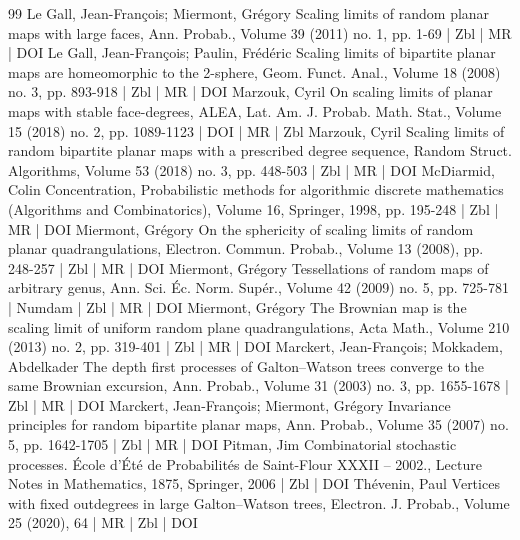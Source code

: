 \documentclass[10pt]{amsart}
\theoremstyle{definition}\newtheorem{defi}[theo]{Definition}\newtheorem{rema}[theo]{Remark}\newtheorem{exam}[theo]{Example}\newtheorem{exem}[theo]{Example}\newtheorem{nota}[theo]{Notation}
\newcommand{\1}{\ensembles{1}}
\providecommand{\?}{}
\begin{document}
\begin{thebibliography}{99}
Le Gall, Jean-François; Miermont, Grégory Scaling limits of random planar maps with large faces, Ann. Probab., Volume 39 (2011) no. 1, pp. 1-69 | Zbl | MR | DOI
Le Gall, Jean-François; Paulin, Frédéric Scaling limits of bipartite planar maps are homeomorphic to the 2-sphere, Geom. Funct. Anal., Volume 18 (2008) no. 3, pp. 893-918 | Zbl | MR | DOI
Marzouk, Cyril On scaling limits of planar maps with stable face-degrees, ALEA, Lat. Am. J. Probab. Math. Stat., Volume 15 (2018) no. 2, pp. 1089-1123 | DOI | MR | Zbl
Marzouk, Cyril Scaling limits of random bipartite planar maps with a prescribed degree sequence, Random Struct. Algorithms, Volume 53 (2018) no. 3, pp. 448-503 | Zbl | MR | DOI
McDiarmid, Colin Concentration, Probabilistic methods for algorithmic discrete mathematics (Algorithms and Combinatorics), Volume 16, Springer, 1998, pp. 195-248 | Zbl | MR | DOI
Miermont, Grégory On the sphericity of scaling limits of random planar quadrangulations, Electron. Commun. Probab., Volume 13 (2008), pp. 248-257 | Zbl | MR | DOI
Miermont, Grégory Tessellations of random maps of arbitrary genus, Ann. Sci. Éc. Norm. Supér., Volume 42 (2009) no. 5, pp. 725-781 | Numdam | Zbl | MR | DOI
Miermont, Grégory The Brownian map is the scaling limit of uniform random plane quadrangulations, Acta Math., Volume 210 (2013) no. 2, pp. 319-401 | Zbl | MR | DOI
Marckert, Jean-François; Mokkadem, Abdelkader The depth first processes of Galton–Watson trees converge to the same Brownian excursion, Ann. Probab., Volume 31 (2003) no. 3, pp. 1655-1678 | Zbl | MR | DOI
Marckert, Jean-François; Miermont, Grégory Invariance principles for random bipartite planar maps, Ann. Probab., Volume 35 (2007) no. 5, pp. 1642-1705 | Zbl | MR | DOI
Pitman, Jim Combinatorial stochastic processes. École d’Été de Probabilités de Saint-Flour XXXII – 2002., Lecture Notes in Mathematics, 1875, Springer, 2006 | Zbl | DOI
Thévenin, Paul Vertices with fixed outdegrees in large Galton–Watson trees, Electron. J. Probab., Volume 25 (2020), 64 | MR | Zbl | DOI
\end{thebibliography}
\end{document}
